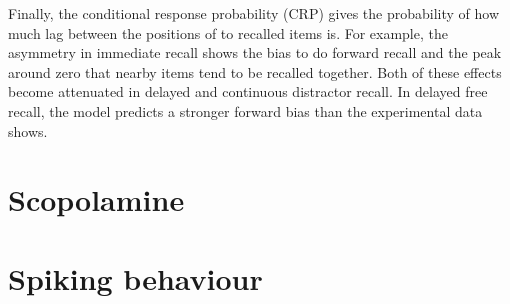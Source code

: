 Finally, the conditional response probability (CRP) gives the probability of how much lag between the positions of to recalled items is.
For example, the asymmetry in immediate recall shows the bias to do forward recall and the peak around zero that nearby items tend to be recalled together.
Both of these effects become attenuated in delayed and continuous distractor recall.
In delayed free recall, the model predicts a stronger forward bias than the experimental data shows.


\section{Scopolamine}


\section{Spiking behaviour}
